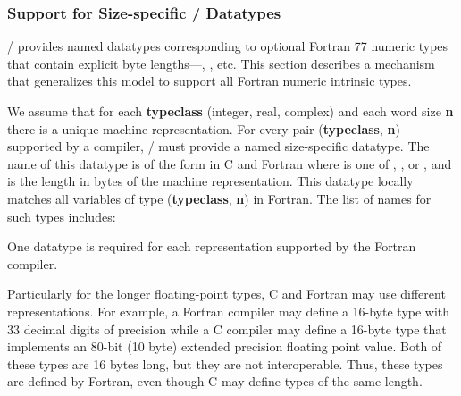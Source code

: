 \subsubsection{Support for Size-specific \texorpdfstring{\MPI/}{MPI} Datatypes}
\label{subsubsec:sizespecific}

\MPI/
provides named datatypes corresponding to optional Fortran 77
numeric types that contain explicit byte lengths---,
, etc. This section describes a mechanism
that generalizes this model to support all Fortran numeric
intrinsic types.

We assume that for each \textbf{typeclass} (integer, real, complex) and each
word size \textbf{n} there is a unique machine representation.
For every pair (\textbf{typeclass}, \textbf{n}) supported by a compiler,
\MPI/ must provide a named size-specific datatype.
The name of this datatype is of the form
 in C and
Fortran where  is one of
, , or , %
and  is the length in bytes of the
machine representation.  This datatype locally matches all variables
of type (\textbf{typeclass}, \textbf{n}) in Fortran.  The list of names for such types
includes:
\begin{constlist}
\end{constlist}
One
datatype is required for each representation supported by
the Fortran compiler.

\begin{rationale}
  Particularly for the longer floating-point types, C and Fortran may
  use different representations. For example, a Fortran compiler may
  define a 16-byte  type with 33 decimal digits of
  precision while a C compiler may define a 16-byte  type that implements an 80-bit (10 byte) extended
  precision floating point value. Both of these types are 16 bytes
  long, but they are not interoperable. Thus, these types are defined
  by Fortran, even though C may define types of the same length.
\end{rationale}

